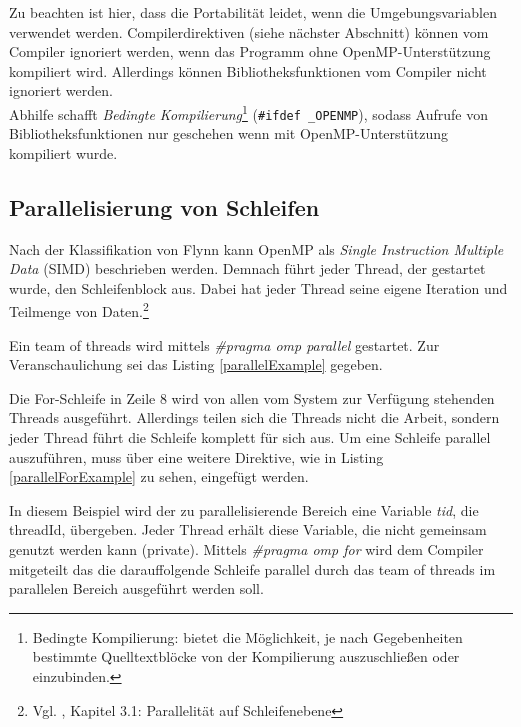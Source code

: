\documentclass[11pt]{scrartcl}
\begin{document}
Zu beachten ist hier, dass die Portabilität leidet, wenn die Umgebungsvariablen verwendet werden. Compilerdirektiven (siehe nächster Abschnitt) können vom Compiler ignoriert werden, wenn das Programm ohne OpenMP-Unterstützung kompiliert wird. Allerdings können Bibliotheksfunktionen vom Compiler nicht ignoriert werden. \\
Abhilfe schafft \textit{Bedingte Kompilierung}\footnote{Bedingte Kompilierung: bietet die Möglichkeit, je nach Gegebenheiten bestimmte Quelltextblöcke von der Kompilierung auszuschließen oder einzubinden. } (\texttt{\#ifdef \_OPENMP}), sodass Aufrufe von Bibliotheksfunktionen nur geschehen wenn mit OpenMP-Unterstützung kompiliert wurde. 

\subsection{Parallelisierung von Schleifen} 
Nach der Klassifikation von Flynn kann OpenMP als \emph{Single Instruction Multiple Data} (SIMD) beschrieben werden. Demnach führt jeder Thread, der gestartet wurde, den Schleifenblock aus. Dabei hat jeder Thread seine eigene Iteration und Teilmenge von Daten.\footnote{Vgl. \cite{openmp08}, Kapitel 3.1: Parallelität auf Schleifenebene}

Ein team of threads wird mittels \textit{\#pragma omp parallel} gestartet. Zur Veranschaulichung sei das Listing \ref{parallelExample} gegeben. 

Die For-Schleife in Zeile 8 wird von allen vom System zur Verfügung stehenden Threads ausgeführt. Allerdings teilen sich die Threads nicht die Arbeit, sondern jeder Thread führt die Schleife komplett für sich aus. Um eine Schleife parallel auszuführen, muss über eine weitere Direktive, wie in Listing \ref{parallelForExample} zu sehen, eingefügt werden. 

In diesem Beispiel wird der zu parallelisierende Bereich eine Variable \textit{tid}, die threadId, übergeben. Jeder Thread erhält diese Variable, die nicht gemeinsam genutzt werden kann (private). Mittels \textit{\#pragma omp for} wird dem Compiler mitgeteilt das die darauffolgende Schleife parallel durch das team of threads  im parallelen Bereich ausgeführt werden soll.
\end{document}

